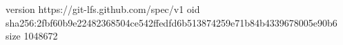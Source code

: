 version https://git-lfs.github.com/spec/v1
oid sha256:2fbf60b9e22482368504ce542ffedfd6b513874259e71b84b4339678005e90b6
size 1048672
